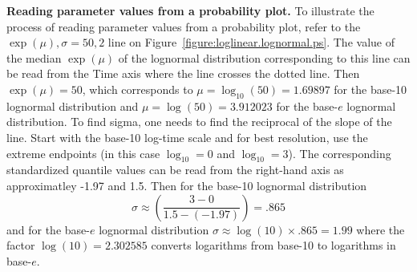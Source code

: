 \begin{example}
{\bf Reading parameter values from a probability plot.}  To
illustrate the process of reading parameter values from a
probability plot, refer to
the $\exp(\mu), \sigma= 50, 2$ line
on Figure~\ref{figure:loglinear.lognormal.ps}. The value of the
median $\exp(\mu)$ of the lognormal distribution corresponding to this line
can be read from the Time axis where the line crosses the dotted
line. Then $\exp(\mu)=50$, which corresponds to
$\mu=\log_{10}(50)=1.69897$ for the base-10 lognormal
distribution
and $\mu=\log(50)=3.912023$ for the base-$e$ lognormal distribution.
To find sigma, one needs to find the reciprocal of the slope 
of the line. Start with the base-10
log-time
scale and for best resolution, use the extreme endpoints (in this
case $\log_{10} = 0$ and  $\log_{10} = 3$). The corresponding
standardized quantile values can be read 
from the right-hand axis as approximatley  -1.97 and 1.5.
Then for the base-10 lognormal distribution
\begin{displaymath}
 \sigma \approx \left( \frac{3-0}{1.5-(-1.97)}
\right) = .865 
\end{displaymath}
and for the base-$e$ lognormal distribution
$\sigma \approx \log(10) \times .865=1.99$
where the factor $\log(10)=2.302585$ converts logarithms from 
base-10 to logarithms in base-$e$.

\end{example}

